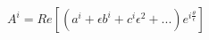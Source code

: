 \begin{equation}
A^{i}=Re[(a^{i}+{\epsilon}b^{i}+c^{i}{\epsilon}^{2}+...)e^{i\frac{\theta}{\epsilon}}]
\label{18}
\end{equation}

